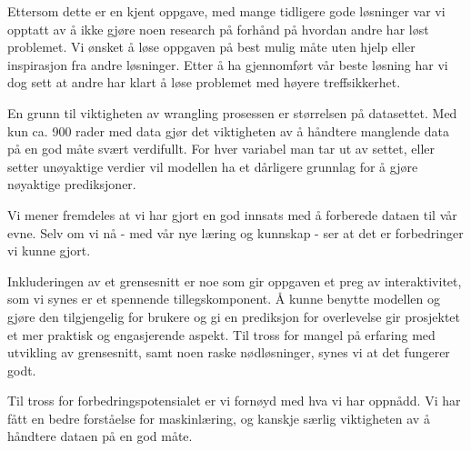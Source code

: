 \documentclass[
]{article}
\begin{document}
Ettersom dette er en kjent oppgave, med mange tidligere gode løsninger
var vi opptatt av å ikke gjøre noen research på forhånd på hvordan andre
har løst problemet. Vi ønsket å løse oppgaven på best mulig måte uten
hjelp eller inspirasjon fra andre løsninger. Etter å ha gjennomført vår
beste løsning har vi dog sett at andre har klart å løse problemet med
høyere treffsikkerhet.

En grunn til viktigheten av wrangling prosessen er størrelsen på
datasettet. Med kun ca. 900 rader med data gjør det viktigheten av å
håndtere manglende data på en god måte svært verdifullt. For hver
variabel man tar ut av settet, eller setter unøyaktige verdier vil
modellen ha et dårligere grunnlag for å gjøre nøyaktige prediksjoner.

Vi mener fremdeles at vi har gjort en god innsats med å forberede dataen
til vår evne. Selv om vi nå - med vår nye læring og kunnskap - ser at
det er forbedringer vi kunne gjort.

Inkluderingen av et grensesnitt er noe som gir oppgaven et preg av
interaktivitet, som vi synes er et spennende tillegskomponent. Å kunne
benytte modellen og gjøre den tilgjengelig for brukere og gi en
prediksjon for overlevelse gir prosjektet et mer praktisk og
engasjerende aspekt. Til tross for mangel på erfaring med utvikling av
grensesnitt, samt noen raske nødløsninger, synes vi at det fungerer
godt.

Til tross for forbedringspotensialet er vi fornøyd med hva vi har
oppnådd. Vi har fått en bedre forståelse for maskinlæring, og kanskje
særlig viktigheten av å håndtere dataen på en god måte.
\end{document}
